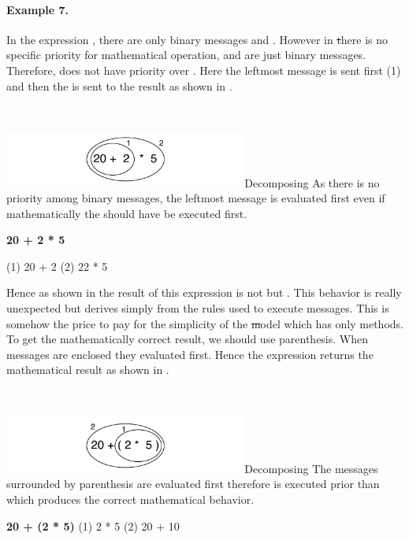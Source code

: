 \paragraph{Example 7.} 
In the expression , there are only binary messages \ct{+} and \ct{*}. However in \st there is no specific priority for mathematical operation, \ct{+} and \ct{*} are just binary messages. Therefore,  \ct{*} does not have priority over \ct{+}. Here the leftmost message \ct{+} is sent first (1) and then the \ct{*} is sent to the result as shown in .  


\  

\begin{decompfigwithsize}[0.6]{\includegraphics[width=8cm]{ucompoNoBracketPar}}{Decomposing }\label{scr:binaryMessages1}
As there is no priority among binary messages, the leftmost message \ct{+} is evaluated first even if mathematically the \ct{*} should have be executed first. 

      \textbf{20 + 2 * 5}
  
(1)  20 + 2
(2)  22 * 5
\end{decompfigwithsize}

Hence as shown in  the result of this expression is not  but . This behavior is really unexpected but derives simply from the rules used to execute messages. This is somehow the price to pay for the simplicity of the \st model which has only methods. To get the mathematically correct result, we should use parenthesis. When messages are enclosed they evaluated first. Hence the expression  returns the mathematical result as shown in . 

\


\begin{decompfigwithsize}[0.6]{\includegraphics[width=8cm]{ucompoNumberBracket}}{Decomposing }\label{scr:mathcorrect}
The messages surrounded by parenthesis are evaluated first therefore \ct{*} is executed prior than \ct{+} which produces the correct mathematical behavior.

         \textbf{20 + (2 * 5)}
(1)              2 * 5
(2)    20 + 10
\end{decompfigwithsize}


